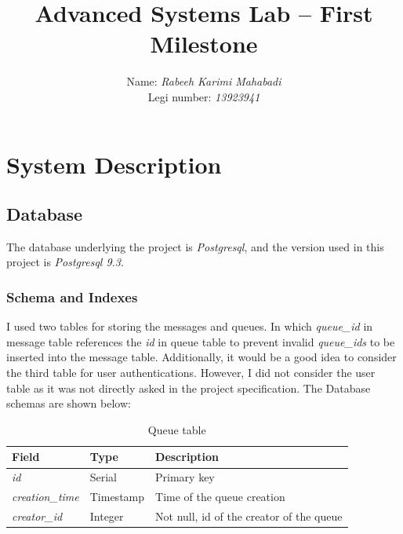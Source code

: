 \documentclass[11pt]{article}
\begin{document}
\pagestyle{plain}


\title{Advanced Systems Lab -- First Milestone}

\author{Name: \emph{Rabeeh Karimi Mahabadi}\\Legi number: \emph{13923941}}

\maketitle

\newpage

\tableofcontents
\newpage


\section{System Description}\label{sec:system-description}

\subsection{Database}\label{sec:database}
The database underlying the project is \emph{Postgresql}, and the version used 
in this project is \emph{Postgresql 9.3}.

\subsubsection{Schema and Indexes}\label{sec:schema-and-indexes}
I used two tables for storing the messages and queues. In which \emph{queue\_id} in message
table references the \emph{id} in queue table to prevent invalid \emph{queue\_ids} to be inserted into the 
message table. Additionally, it would be a good idea to consider the third table for user authentications. However, I 
did not consider the user table as it was not directly asked in the project 
specification. The Database schemas are shown below:

\begin{table}[!ht]
\centering
\begin{tabular}{lll}
\toprule
Field & Type & Description \\ \midrule
\emph{id} & Serial & Primary key \\
\emph{creation\_time} & Timestamp & Time of the queue creation \\
\emph{creator\_id} & Integer & Not null, id of the creator of the queue  \\\bottomrule
\end{tabular}
\caption{Queue table}
\end{table}
\end{document}
